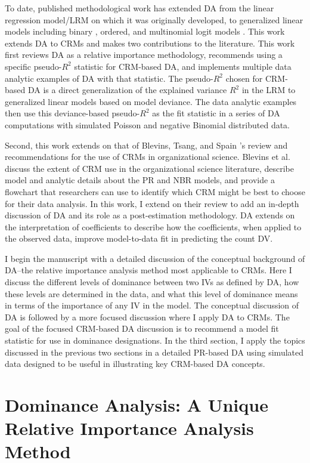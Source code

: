 \documentclass[man]{apa7}
\begin{document}
	To date, published methodological work has extended DA from the linear regression model/LRM on which it was originally developed, to generalized linear models including binary \parencite{azen2009using}, ordered, and multinomial logit models \parencite{luchman2014relative}.	
	This work extends DA to CRMs and makes two contributions to the literature.
	This work first reviews DA as a relative importance methodology, recommends using a specific pseudo-$R^2$ statistic for CRM-based DA, and implements multiple data analytic examples of DA with that statistic.
	The pseudo-$R^2$ chosen for CRM-based DA is a direct generalization of the explained variance $R^2$ in the LRM to generalized linear models based on model deviance.
	The data analytic examples then use this deviance-based pseudo-$R^2$ as the fit statistic in a series of DA computations with simulated Poisson and negative Binomial distributed data.

	Second, this work extends on that of Blevins, Tsang, and Spain \parencite*{blevins2015count}'s review and recommendations for the use of CRMs in organizational science. 
	Blevins et al. discuss the extent of CRM use in the organizational science literature, describe model and analytic details about the PR and NBR models, and provide a flowchart that researchers can use to identify which CRM might be best to choose for their data analysis.
	In this work, I extend on their review to add an in-depth discussion of DA and its role as a post-estimation methodology.
	DA extends on the interpretation of coefficients to describe how the coefficients, when applied to the observed data, improve model-to-data fit in predicting the count DV.

	I begin the manuscript with a detailed discussion of the conceptual background of DA--the relative importance analysis method most applicable to CRMs.	
 	Here I discuss the different levels of dominance between two IVs as defined by DA, how these levels are determined in the data, and what this level of dominance means in terms of the importance of any IV in the model.
	The conceptual discussion of DA is followed by a more focused discussion where I apply DA to CRMs.
	The goal of the focused CRM-based DA discussion is to recommend a model fit statistic for use in dominance designations.
	In the third section, I apply the topics discussed in the previous two sections in a detailed PR-based DA using simulated data designed to be useful in illustrating key CRM-based DA concepts.
		
\section{Dominance Analysis: A Unique Relative Importance Analysis Method}
\end{document}
